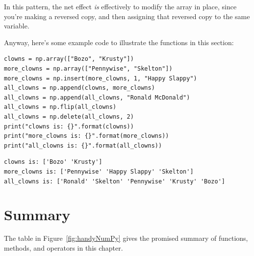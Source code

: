 In this pattern, the net effect \textit{is} effectively to modify the array in
place, since you're making a reversed copy, and then assigning that reversed
copy to the same variable.

Anyway, here's some example code to illustrate the functions in this section:

\begin{Verbatim}[fontsize=\small,samepage=true,frame=single,framesep=3mm]
clowns = np.array(["Bozo", "Krusty"])
more_clowns = np.array(["Pennywise", "Skelton"])
more_clowns = np.insert(more_clowns, 1, "Happy Slappy")
all_clowns = np.append(clowns, more_clowns)
all_clowns = np.append(all_clowns, "Ronald McDonald")
all_clowns = np.flip(all_clowns)
all_clowns = np.delete(all_clowns, 2)
print("clowns is: {}".format(clowns))
print("more_clowns is: {}".format(more_clowns))
print("all_clowns is: {}".format(all_clowns))
\end{Verbatim}

\begin{Verbatim}[fontsize=\footnotesize,samepage=true,frame=leftline,framesep=5mm,framerule=1mm]
clowns is: ['Bozo' 'Krusty']
more_clowns is: ['Pennywise' 'Happy Slappy' 'Skelton']
all_clowns is: ['Ronald' 'Skelton' 'Pennywise' 'Krusty' 'Bozo']
\end{Verbatim}



\section{Summary}

The table in Figure~\ref{fig:handyNumPy} gives the promised summary of
functions, methods, and operators in this chapter.

\setlength\extrarowheight{5pt}

